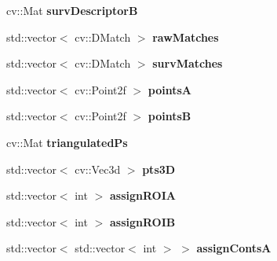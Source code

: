 \begin{DoxyCompactItemize}
\item 
cv\+::\+Mat {\bfseries surv\+DescriptorB}\hypertarget{structStereoContainer_aad5fdcb0a0d0f72bdd285320ca57c130}{}\label{structStereoContainer_aad5fdcb0a0d0f72bdd285320ca57c130}

\item 
std\+::vector$<$ cv\+::\+D\+Match $>$ {\bfseries raw\+Matches}\hypertarget{structStereoContainer_af1a057cffe2305a356f7f53d28222021}{}\label{structStereoContainer_af1a057cffe2305a356f7f53d28222021}

\item 
std\+::vector$<$ cv\+::\+D\+Match $>$ {\bfseries surv\+Matches}\hypertarget{structStereoContainer_ae2e2a30a2fece68f7fb512aa227d9758}{}\label{structStereoContainer_ae2e2a30a2fece68f7fb512aa227d9758}

\item 
std\+::vector$<$ cv\+::\+Point2f $>$ {\bfseries pointsA}\hypertarget{structStereoContainer_af432f8f44ab47dd3d3950290b86471f5}{}\label{structStereoContainer_af432f8f44ab47dd3d3950290b86471f5}

\item 
std\+::vector$<$ cv\+::\+Point2f $>$ {\bfseries pointsB}\hypertarget{structStereoContainer_a5a6ad0883a3d2f795d4b36baa6feb8ae}{}\label{structStereoContainer_a5a6ad0883a3d2f795d4b36baa6feb8ae}

\item 
cv\+::\+Mat {\bfseries triangulated\+Ps}\hypertarget{structStereoContainer_ac173f4d32106a036107612ec67fd6c00}{}\label{structStereoContainer_ac173f4d32106a036107612ec67fd6c00}

\item 
std\+::vector$<$ cv\+::\+Vec3d $>$ {\bfseries pts3D}\hypertarget{structStereoContainer_ad47be6f8169d6b94d3f207c4f964758b}{}\label{structStereoContainer_ad47be6f8169d6b94d3f207c4f964758b}

\item 
std\+::vector$<$ int $>$ {\bfseries assign\+R\+O\+IA}\hypertarget{structStereoContainer_af770304c5f78498dd6c4c67afee32a9c}{}\label{structStereoContainer_af770304c5f78498dd6c4c67afee32a9c}

\item 
std\+::vector$<$ int $>$ {\bfseries assign\+R\+O\+IB}\hypertarget{structStereoContainer_aada0f9038537af33072bd550b39bff1b}{}\label{structStereoContainer_aada0f9038537af33072bd550b39bff1b}

\item 
std\+::vector$<$ std\+::vector$<$ int $>$ $>$ {\bfseries assign\+ContsA}\hypertarget{structStereoContainer_a0b37822f890c0d683e604813f548cf78}{}\label{structStereoContainer_a0b37822f890c0d683e604813f548cf78}


\end{DoxyCompactItemize}
